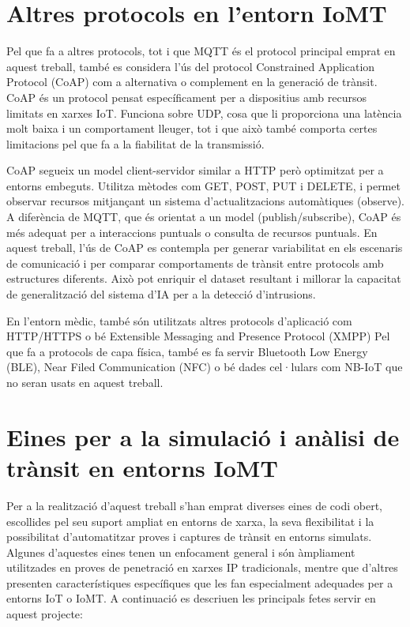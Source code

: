   \section{Altres protocols en l'entorn IoMT}
  Pel que fa a altres protocols, tot i que MQTT és el protocol principal emprat en aquest treball, també es considera l’ús del protocol Constrained Application Protocol (CoAP) com a alternativa o complement en la generació de trànsit. CoAP és un protocol pensat específicament per a dispositius amb recursos limitats en xarxes IoT. Funciona sobre UDP, cosa que li proporciona una latència molt baixa i un comportament lleuger, tot i que això també comporta certes limitacions pel que fa a la fiabilitat de la transmissió. 

  CoAP segueix un model client-servidor similar a HTTP però optimitzat per a entorns embeguts. Utilitza mètodes com GET, POST, PUT i DELETE, i permet observar recursos mitjançant un sistema d’actualitzacions automàtiques (observe). A diferència de MQTT, que és orientat a un model (publish/subscribe), CoAP és més adequat per a interaccions puntuals o consulta de recursos puntuals. En aquest treball, l’ús de CoAP es contempla per generar variabilitat en els escenaris de comunicació i per comparar comportaments de trànsit entre protocols amb estructures diferents. Això pot enriquir el dataset resultant i millorar la capacitat de generalització del sistema d’IA per a la detecció d’intrusions. 

  En l’entorn mèdic, també són utilitzats altres protocols d’aplicació com HTTP/HTTPS o bé Extensible Messaging and Presence Protocol (XMPP) Pel que fa a protocols de capa física, també es fa servir Bluetooth Low Energy (BLE), Near Filed Communication (NFC) o bé dades cel·lulars com NB-IoT que no seran usats en aquest treball.

  \section{Eines per a la simulació i anàlisi de trànsit en entorns IoMT}
  Per a la realització d’aquest treball s’han emprat diverses eines de codi obert, escollides pel seu suport ampliat en entorns de xarxa, la seva flexibilitat i la possibilitat d’automatitzar proves i captures de trànsit en entorns simulats. Algunes d’aquestes eines tenen un enfocament general i són àmpliament utilitzades en proves de penetració en xarxes IP tradicionals, mentre que d’altres presenten característiques específiques que les fan especialment adequades per a entorns IoT o IoMT. A continuació es descriuen les principals fetes servir en aquest projecte: 

